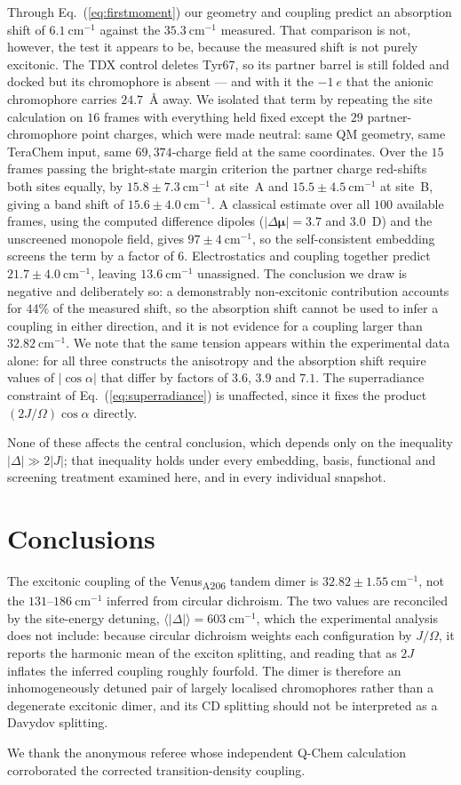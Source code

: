 \documentclass[journal=jpcbfk, manuscript=article, layout=twocolumn, doi=true]{achemso}
\begin{document}
Through Eq.~(\ref{eq:firstmoment}) our geometry and coupling predict an
absorption shift of $6.1~\mathrm{cm^{-1}}$ against the $35.3~\mathrm{cm^{-1}}$
measured. That comparison is not, however, the test it appears to be, because
the measured shift is not purely excitonic. The TDX control deletes Tyr67, so
its partner barrel is still folded and docked but its chromophore is absent ---
and with it the $-1~e$ that the anionic chromophore carries $24.7$~\AA{} away.
We isolated that term by repeating the site calculation on $16$ frames with
everything held fixed except the $29$ partner-chromophore point charges, which
were made neutral: same QM geometry, same TeraChem input, same
$69{,}374$-charge field at the same coordinates. Over the $15$ frames passing
the bright-state margin criterion the partner charge red-shifts both sites
equally, by $15.8 \pm 7.3~\mathrm{cm^{-1}}$ at site~A and
$15.5 \pm 4.5~\mathrm{cm^{-1}}$ at site~B, giving a band shift of
$15.6 \pm 4.0~\mathrm{cm^{-1}}$. A classical estimate over all $100$ available
frames, using the computed difference dipoles
($|\Delta\bm\mu| = 3.7$ and $3.0$~D) and the unscreened monopole field, gives
$97 \pm 4~\mathrm{cm^{-1}}$, so the self-consistent embedding screens the term
by a factor of $6$. Electrostatics and coupling together predict
$21.7 \pm 4.0~\mathrm{cm^{-1}}$, leaving $13.6~\mathrm{cm^{-1}}$ unassigned.
The conclusion we draw is negative and deliberately so: a demonstrably
non-excitonic contribution accounts for $44\%$ of the measured shift, so the
absorption shift cannot be used to infer a coupling in either direction, and it
is not evidence for a coupling larger than $32.82~\mathrm{cm^{-1}}$. We note that the
same tension appears within the experimental data alone: for all three
constructs the anisotropy and the absorption shift require values of
$|\cos\alpha|$ that differ by factors of $3.6$, $3.9$ and $7.1$. The
superradiance constraint of Eq.~(\ref{eq:superradiance}) is unaffected, since
it fixes the product $(2J/\Omega)\cos\alpha$ directly.

None of these affects the central conclusion, which depends only on the
inequality $|\Delta| \gg 2|J|$; that inequality holds under every embedding,
basis, functional and screening treatment examined here, and in every
individual snapshot.

\section{Conclusions}

The excitonic coupling of the Venus\textsubscript{A206} tandem dimer is
$32.82 \pm 1.55~\mathrm{cm^{-1}}$, not the $131$--$186~\mathrm{cm^{-1}}$
inferred from circular dichroism. The two values are reconciled by the
site-energy detuning, $\langle|\Delta|\rangle = 603~\mathrm{cm^{-1}}$, which
the experimental analysis does not include: because circular dichroism weights
each configuration by $J/\Omega$, it reports the harmonic mean of the exciton
splitting, and reading that as $2J$ inflates the inferred coupling roughly
fourfold. The dimer is therefore an inhomogeneously detuned pair of largely
localised chromophores rather than a degenerate excitonic dimer, and its CD
splitting should not be interpreted as a Davydov splitting.

\begin{acknowledgement}
We thank the anonymous referee whose independent Q-Chem calculation
corroborated the corrected transition-density coupling.
\end{acknowledgement}


\end{document}
